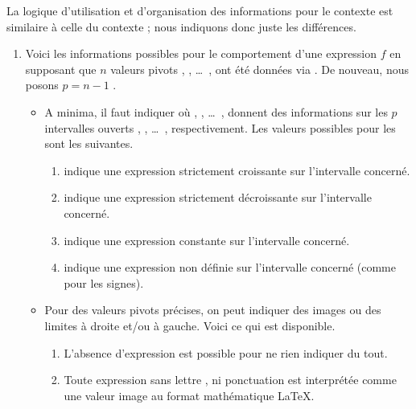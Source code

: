 La logique d'utilisation et d'organisation des informations pour le contexte  est similaire à celle du contexte  ; nous indiquons donc juste les différences.
%
\begin{enumerate}
    \item Voici les informations possibles pour le comportement d'une expression $f$ en supposant que $n$ valeurs pivots  ,  , \dots\ ,  ont été données via  . De nouveau, nous posons $p = n - 1$ .
    \begin{itemize}
        \item A minima, il faut indiquer
        où
         ,  , \dots\ , 
        donnent des informations sur les $p$ intervalles ouverts
        \tdoclatexin{]x_1 ; x_2[} , \tdoclatexin{]x_2 ; x_3[} , \dots\ , \tdoclatexin{]x_p ; x_n[} respectivement.
        Les valeurs possibles pour les  sont les suivantes.
        \begin{enumerate}
            \item \tdoclatexin{<} indique une expression strictement croissante sur l'intervalle concerné.

            \item \tdoclatexin{>} indique une expression strictement décroissante sur l'intervalle concerné.

            \item \tdoclatexin{=} indique une expression constante sur l'intervalle concerné.

            \item {} indique une expression non définie sur l'intervalle concerné (comme pour les signes).
        \end{enumerate}


        \item Pour des valeurs pivots précises, on peut indiquer des images ou des limites à droite et/ou à gauche. Voici ce qui est disponible.
        \begin{enumerate}
            \item L'absence d'expression est possible pour ne rien indiquer du tout.

            \item Toute expression sans lettre , ni ponctuation \tdoclatexin{!} est interprétée comme une valeur image au format mathématique \LaTeX.


\end{enumerate}
\end{itemize}
\end{enumerate}
